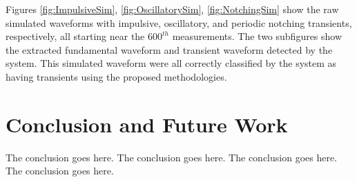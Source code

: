 \documentclass[10pt,conference,compsocconf]{IEEEtran}
\begin{document}
Figures \ref{fig:ImpulsiveSim}, \ref{fig:OscillatorySim}, \ref{fig:NotchingSim} show the raw simulated waveforms with impulsive, oscillatory, and periodic notching transients, respectively, all starting near the $600^{th}$ measurements. The two subfigures show the extracted fundamental waveform and transient waveform detected by the system. This simulated waveform were all correctly classified by the system as having transients using the proposed methodologies. 

\section{Conclusion and Future Work}
\label{sec:Conlcusion}
The conclusion goes here.
The conclusion goes here.
The conclusion goes here.
The conclusion goes here.





%
%
%
%
%




\end{document}
